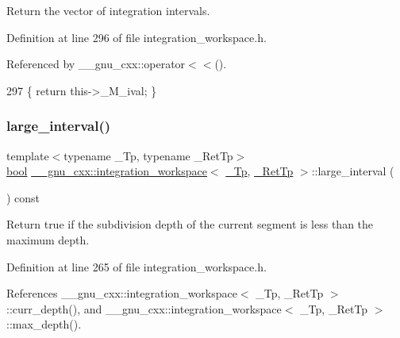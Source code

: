 Return the vector of integration intervals. 



Definition at line 296 of file integration\+\_\+workspace.\+h.



Referenced by \+\_\+\+\_\+gnu\+\_\+cxx\+::operator$<$$<$().


\begin{DoxyCode}
297       \{ \textcolor{keywordflow}{return} this->\_M\_ival; \}
\end{DoxyCode}
\mbox{\label{class____gnu__cxx_1_1integration__workspace_a2e87749af2ee073b05442484ba9e7cf0}} 
\subsubsection{\texorpdfstring{large\+\_\+interval()}{large\_interval()}}
{\footnotesize\ttfamily template$<$typename \+\_\+\+Tp, typename \+\_\+\+Ret\+Tp$>$ \\
\hyperlink{namespace____gnu__cxx_ae83aca57f97767d5d09188718728a0ac}{bool} \hyperlink{class____gnu__cxx_1_1integration__workspace}{\+\_\+\+\_\+gnu\+\_\+cxx\+::integration\+\_\+workspace}$<$ \hyperlink{namespace____gnu__cxx_a3b19a9c800ca194374ef9172290f7d79}{\+\_\+\+Tp}, \hyperlink{namespace____gnu__cxx_a886e03ece3d53ff7fa6c098a40f93fa5}{\+\_\+\+Ret\+Tp} $>$\+::large\+\_\+interval (\begin{DoxyParamCaption}{ }\end{DoxyParamCaption}) const\hspace{0.3cm}{\ttfamily [inline]}}

Return true if the subdivision depth of the current segment is less than the maximum depth. 

Definition at line 265 of file integration\+\_\+workspace.\+h.



References \+\_\+\+\_\+gnu\+\_\+cxx\+::integration\+\_\+workspace$<$ \+\_\+\+Tp, \+\_\+\+Ret\+Tp $>$\+::curr\+\_\+depth(), and \+\_\+\+\_\+gnu\+\_\+cxx\+::integration\+\_\+workspace$<$ \+\_\+\+Tp, \+\_\+\+Ret\+Tp $>$\+::max\+\_\+depth().


